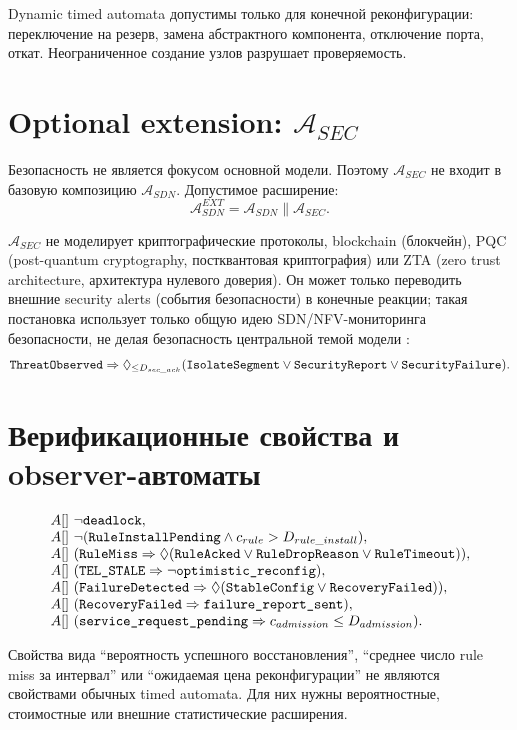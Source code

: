 \documentclass[10pt,a4paper]{article}
\newcommand{\code}[1]{\ifmmode\text{\ttfamily\detokenize{#1}}\else\texttt{\detokenize{#1}}\fi}
\newcommand{\A}[1]{\mathcal{A}_{#1}}
\begin{document}
Dynamic timed automata допустимы только для конечной реконфигурации: переключение на резерв, замена абстрактного компонента, отключение порта, откат. Неограниченное создание узлов разрушает проверяемость.

\section{Optional extension: \(\A{SEC}\)}

Безопасность не является фокусом основной модели. Поэтому \(\A{SEC}\) не входит в базовую композицию \(\A{SDN}\). Допустимое расширение:
\[
\A{SDN}^{EXT}=\A{SDN}\parallel \A{SEC}.
\]

\(\A{SEC}\) не моделирует криптографические протоколы, blockchain (блокчейн), PQC (post-quantum cryptography, постквантовая криптография) или ZTA (zero trust architecture, архитектура нулевого доверия). Он может только переводить внешние security alerts (события безопасности) в конечные реакции; такая постановка использует только общую идею SDN/NFV-мониторинга безопасности, не делая безопасность центральной темой модели \cite{hirsi_sec,jaadouni_sec}:
\[
\code{ThreatObserved}\Rightarrow
\Diamond_{\le D_{sec\_ack}}
(\code{IsolateSegment}\vee \code{SecurityReport}\vee \code{SecurityFailure}).
\]

\section{Верификационные свойства и observer-автоматы}

\[
\begin{array}{l}
A[]\ \neg\code{deadlock},\\
A[]\ \neg(\code{RuleInstallPending}\land c_{rule}>D_{rule\_install}),\\
A[]\ (\code{RuleMiss}\Rightarrow \Diamond(\code{RuleAcked}\vee \code{RuleDropReason}\vee \code{RuleTimeout})),\\
A[]\ (\code{TEL_STALE}\Rightarrow \neg\code{optimistic_reconfig}),\\
A[]\ (\code{FailureDetected}\Rightarrow \Diamond(\code{StableConfig}\vee \code{RecoveryFailed})),\\
A[]\ (\code{RecoveryFailed}\Rightarrow \code{failure_report_sent}),\\
A[]\ (\code{service_request_pending}\Rightarrow c_{admission}\le D_{admission}).
\end{array}
\]

Свойства вида ``вероятность успешного восстановления'', ``среднее число rule miss за интервал'' или ``ожидаемая цена реконфигурации'' не являются свойствами обычных timed automata. Для них нужны вероятностные, стоимостные или внешние статистические расширения.
\end{document}

